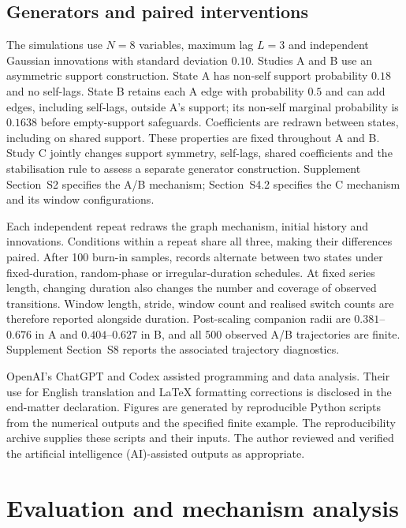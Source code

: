 \documentclass[11pt]{article}
\begin{document}
\subsection{Generators and paired interventions}
\label{sec:generator}
The simulations use $N=8$ variables, maximum lag $L=3$ and independent
Gaussian innovations with standard deviation $0.10$. Studies A and B use
an asymmetric support construction. State A has non-self support probability
$0.18$ and no self-lags. State B retains each A edge with probability $0.5$
and can add edges, including self-lags, outside A's support; its non-self
marginal probability is $0.1638$ before empty-support safeguards. Coefficients
are redrawn between states, including on shared support. These properties
are fixed throughout A and B. Study C jointly changes support symmetry,
self-lags, shared coefficients and the stabilisation rule to assess a separate
generator construction. Supplement Section~S2 specifies the A/B mechanism;
Section~S4.2 specifies the C mechanism and its window configurations.

Each independent repeat redraws the graph mechanism, initial history and
innovations. Conditions within a repeat share all three, making their
differences paired. After 100 burn-in samples, records alternate between
two states under fixed-duration, random-phase or irregular-duration schedules.
At fixed series length, changing duration also changes the number and coverage
of observed transitions. Window length, stride, window count and realised
switch counts are therefore reported alongside duration.
Post-scaling companion radii are $0.381$--$0.676$ in A and
$0.404$--$0.627$ in B, and all 500 observed A/B trajectories are finite.
Supplement Section~S8 reports the associated trajectory diagnostics.

OpenAI's ChatGPT and Codex assisted programming and data analysis. Their use
for English translation and LaTeX formatting corrections is disclosed in the
end-matter declaration. Figures are generated by reproducible Python scripts
from the numerical outputs and the specified finite example. The reproducibility
archive supplies these scripts and their inputs. The author reviewed and
verified the artificial intelligence (AI)-assisted outputs as appropriate.

\section{Evaluation and mechanism analysis}
\label{sec:evaluation}
\end{document}
